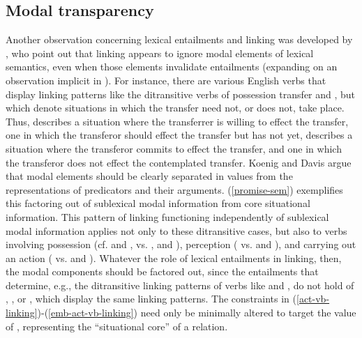 \documentclass[output=paper
                ,modfonts
                ,nonflat
	        ,collection
	        ,collectionchapter
	        ,collectiontoclongg
 	        ,biblatex
                ,babelshorthands
                ,newtxmath
                ,draftmode
                ,colorlinks, citecolor=brown
]{./langsci/langscibook}
\begin{document}
\subsection{Modal transparency}
Another observation concerning lexical entailments  and linking was developed by \citet{KoenigandDavis2001}, who point out that linking appears to ignore modal elements of lexical semantics, even when those elements invalidate entailments (expanding on an observation implicit in \citealt{Goldberg1995}).
For instance, there are various English verbs that display linking patterns like the ditransitive  verbs of possession transfer  and , but which denote situations in which the transfer need not, or does not, take place.
Thus,  describes a situation where the transferrer is willing to effect the transfer,  one in which the transferor should effect the transfer but has not yet,  describes a situation where the transferor commits to effect the transfer, and  one in which the transferor does not effect the contemplated transfer. 
Koenig and Davis argue that modal elements should be clearly separated in \content values from the representations of predicators and their arguments.  (\ref{promise-sem}) exemplifies this factoring out of sublexical modal information from core situational information. This pattern of linking functioning independently of sublexical modal information applies not only to these ditransitive cases, but also to verbs involving possession (cf.  and , vs. ,  and ), perception ( vs.  and ), and carrying out an action ( vs.  and ).  Whatever the role of lexical entailments in linking, then, the modal components should be factored out, since the entailments that determine, e.g., the ditransitive linking patterns of verbs like  and , do not hold of , , or , which display the same linking patterns. The constraints in (\ref{act-vb-linking})-(\ref{emb-act-vb-linking}) need only be minimally altered to target the value of , representing the ``situational core'' of a relation.
\end{document}
